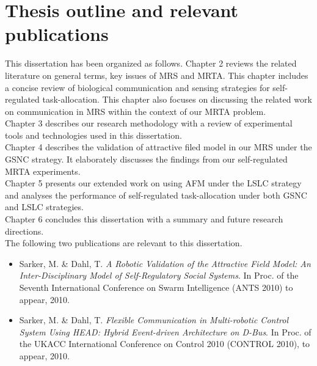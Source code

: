 \section{Thesis outline and relevant publications}
This dissertation has been organized as follows.
Chapter 2  reviews the related literature on general terms, key issues of MRS and MRTA. This chapter includes a concise review of biological communication and sensing strategies for self-regulated task-allocation. This chapter also focuses on discussing the related work on communication in MRS within the context of our MRTA problem.\\
Chapter 3 describes our research methodology with a review of experimental tools and technologies used in this dissertation.\\
Chapter 4 describes the validation of attractive filed model in our MRS under the GSNC strategy. It elaborately discusses the findings from our self-regulated MRTA experiments.\\
Chapter 5 presents our extended work on using AFM under the LSLC strategy and analyses the  performance of self-regulated task-allocation under both GSNC and LSLC strategies.\\
Chapter 6 concludes this dissertation  with a summary and future research directions.\\
The following two publications are relevant to this dissertation.
\begin{itemize}
\item Sarker, M. \& Dahl, T.\textit{ A Robotic Validation of the Attractive Field Model: An Inter-Disciplinary Model of Self-Regulatory Social Systems}. In Proc. of the Seventh International Conference on Swarm Intelligence (ANTS 2010) to appear, 2010.
\item Sarker, M. \& Dahl, T. \textit{Flexible Communication in Multi-robotic Control System Using HEAD: Hybrid Event-driven Architecture on D-Bus}. In Proc. of the UKACC International Conference on Control 2010 (CONTROL 2010), to appear, 2010.
\end{itemize}